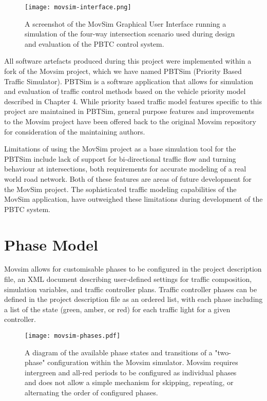 \begin{figure}[]
\centering
	\texttt{[image: movsim-interface.png]}
	\caption{ A screenshot of the MovSim Graphical User Interface running a simulation of the four-way intersection scenario used during design and evaluation of the PBTC control system. }
\label{intersectiondiagram}
\end{figure}

All software artefacts produced during this project were implemented within a fork of the Movsim project, which we have named PBTSim (Priority Based Traffic Simulator). PBTSim is a software application that allows for simulation and evaluation of traffic control methods based on the vehicle priority model described in Chapter 4. While priority based traffic model features specific to this project are maintained in PBTSim, general purpose features and improvements to the Movsim project have been offered back to the original Movsim repository for consideration of the maintaining authors.

Limitations of using the MovSim project as a base simulation tool for the PBTSim include lack of support for bi-directional traffic flow and turning behaviour at intersections, both requirements for accurate modeling of a real world road network. Both of these features are areas of future development for the MovSim project. The sophisticated traffic modeling capabilities of the MovSim application, have outweighed these limitations during development of the PBTC system.

\section{Phase Model}

Movsim allows for customisable phases to be configured in the project description file, an XML document describing user-defined settings for traffic composition, simulation variables, and traffic controller plans. Traffic controller phases can be defined in the project description file as an ordered list, with each phase including a list of the state (green, amber, or red) for each traffic light for a given controller. 

\begin{figure}[]
\centering
	\texttt{[image: movsim-phases.pdf]}
	\caption{ A diagram of the available phase states and transitions of a "two-phase" configuration within the Movsim simulator. Movsim requires intergreen and all-red periods to be configured as individual phases and does not allow a simple mechanism for skipping, repeating, or alternating the order of configured phases. }
\label{movsimphasediagram}
\end{figure}

